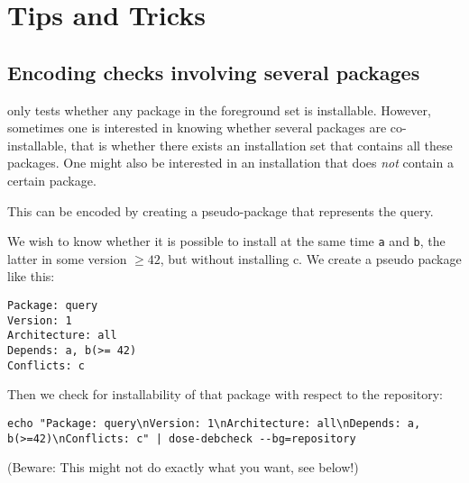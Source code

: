 
\section{Tips and Tricks}
\label{sec:tricks}
\subsection{Encoding checks involving several packages}
\debcheck{} only tests whether any package in the foreground set is
installable. However, sometimes one is interested in knowing whether
several packages are co-installable, that is whether there exists an
installation set that contains all these packages. One might also be
interested in an installation that does \emph{not} contain a certain
package.

This can be encoded by creating a pseudo-package that
represents the query. 

\begin{example}
  We wish to know whether it is possible to install at the same time
  \texttt{a} and \texttt{b}, the latter in some version $\geq 42$, but
  without installing c. We create a pseudo package like this:
\begin{verbatim}
Package: query
Version: 1
Architecture: all
Depends: a, b(>= 42)
Conflicts: c
\end{verbatim}
Then we check for installability of that package with respect to the
repository:
\begin{verbatim}
echo "Package: query\nVersion: 1\nArchitecture: all\nDepends: a, b(>=42)\nConflicts: c" | dose-debcheck --bg=repository
\end{verbatim}
(Beware: This might not do exactly what you want, see below!)
\end{example}

